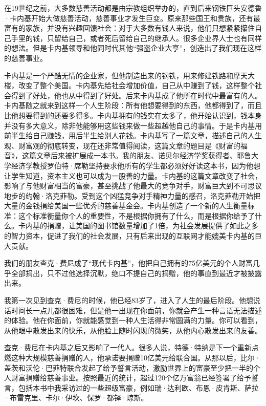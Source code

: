 在19世纪之前，大多数慈善活动都是由宗教组织举办的，直到后来钢铁巨头安德鲁·卡内基开始大做慈善活动，慈善事业才发生巨变。原来那些国王和贵族，还有最富有的家族，并没有兴趣回馈社会：对于大多数有钱人来说，他们只想紧紧攥住自己手里的钱，只留给自己，或者死后留给自己的继承人。很多企业界人士也有同样的想法。但是卡内基领导和他同时代其他“强盗企业大亨”，创造出了我们现在这样的慈善事业。

卡内基是一个严酷无情的企业家，但他制造出来的钢铁，用来修建铁路和摩天大楼，改变了整个美国。卡内基先给社会增加价值，自己从中赚到了钱，这样整个社会得到了好处，他也从中得到了好处。后来卡内基成了他所在时代中最富有的人。卡内基随之就来到这样一个人生阶段：所有他想要得到的东西，他都得到了，而且比他想要得到的还要多得多。卡内基拥有的钱实在太多了，他开始认识到，钱本身并没有多大意义，除非他能够用这些钱来做一些超越他自己的事情。于是卡内基用前半生给自己赚钱，用后半生给别人花钱。卡内基写了一篇文章，描述自己的人生观、财富观的彻底转变，现在还非常值得阅读，这篇文章的题目是《财富的福音》，这篇文章后来被扩展成一本书。我的朋友、诺贝尔经济学奖获得者、耶鲁大学经济学教授罗伯特·席勒坚持要求他所有的学生都必须好好读这本书，因为他想让学生知道，资本主义也可以成为一股善的力量。卡内基的这篇文章改变了社会，影响了与他财富相当的富豪，甚至挑战了他最大的竞争对手，财富巨大到不可思议地步的约翰·洛克菲勒。受到这个凶猛竞争对手精神力量的感召，洛克菲勒开始把大量的金钱捐给美国一些优秀的慈善基金会。卡内基创造了一个新的人生衡量标准：这个标准衡量你个人的重要性，不是根据你拥有了什么，而是根据你给予了什么。卡内基的捐赠，让美国的图书馆数量增加了1倍，为社会发展提供了如此之多的智力资本，促进了我们的社会发展，只有后来出现的互联网才能媲美卡内基的巨大贡献。

我们的朋友查克·费尼成了“现代卡内基”，他把自己拥有的75亿美元的个人财富几乎全部捐出，只不过他选择沉默，绝口不提自己的捐赠，他的事直到最近才被披露出来。

我第一次见到查克·费尼的时候，他已经83岁了，进入了人生的最后阶段。他想说话时间长一点儿都很困难，但是他一出现在你面前，你就会产生一种言语无法描述的体验。他在你面前，你就能感觉到一种人生活得非常圆满的力量。你可以看到，从他眼中散发出来的快乐，从他脸上随时闪现的微笑，从他内心散发出来的友善。

查克·费尼在卡内基之后又影响了一代人。很多人说，特德·特纳是下一个重新点燃这种大规模慈善捐赠的人，他承诺要捐赠10亿美元给联合国。从那以后，比尔·盖茨和沃伦·巴菲特联合发起了给予誓言活动，激励世界上的富豪至少把一半的个人财富捐赠给慈善事业。按照最近的统计，超过120个亿万富翁已经签署了给予誓言，包括本书中我采访过的一些超级富豪，例如瑞·达利欧、布恩·皮肯斯、萨拉·布雷克里、卡尔·伊坎、保罗·都铎·琼斯。

